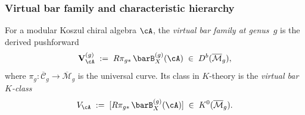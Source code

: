 \subsubsection{Virtual bar family and characteristic hierarchy}
\label{subsubsec:virtual-bar-k-class}

\begin{definition}
\label{def:virtual-bar-k-class}
For a modular Koszul chiral algebra $\cA$, the
\emph{virtual bar family at genus~$g$} is the derived pushforward
\begin{equation}\label{eq:virtual-bar-k-class}
\mathbf{V}_{\cA}^{(g)}
\;:=\;
R\pi_{g*}\, \barB^{(g)}_X(\cA)
\;\in\; D^b(\overline{\mathcal{M}}_g),
\end{equation}
where $\pi_g\colon \overline{\mathcal{C}}_g \to
\overline{\mathcal{M}}_g$ is the universal curve.  Its class in
$K$-theory is the \emph{virtual bar $K$-class}
\begin{equation}\label{eq:V-A-K-class}
V_{\cA}
\;:=\;
[R\pi_{g*}\, \barB^{(g)}_X(\cA)]
\;\in\; K^0(\overline{\mathcal{M}}_g).
\end{equation}
\end{definition}

